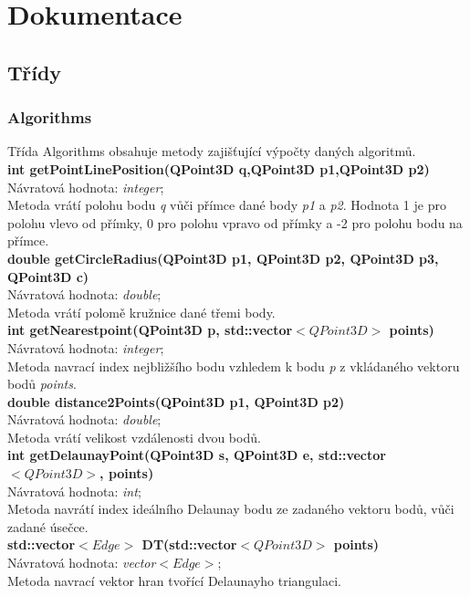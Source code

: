 \documentclass[a4paper, 12pt]{article}
\begin{document}
\section{Dokumentace}
\subsection{Třídy}
\subsubsection{Algorithms}
Třída Algorithms obsahuje metody zajišťující výpočty daných algoritmů.
\\

\textbf{int getPointLinePosition(QPoint3D q,QPoint3D p1,QPoint3D p2)}\\
Návratová hodnota: \textit{integer};\\
Metoda vrátí polohu bodu \textit{q} vůči přímce dané body\textit{ p1} a \textit{p2}. Hodnota 1 je pro polohu vlevo od přímky, 0 pro polohu vpravo od přímky a -2 pro polohu bodu na přímce.
\\

\textbf{double getCircleRadius(QPoint3D p1, QPoint3D p2, QPoint3D p3, QPoint3D c)}\\
Návratová hodnota: \textit{double};\\
Metoda vrátí polomě kružnice dané třemi body.
\\

\textbf{int getNearestpoint(QPoint3D p, std::vector$<QPoint3D>$ points)}\\
Návratová hodnota: \textit{integer};\\
Metoda navrací index nejbližšího bodu vzhledem k bodu \textit{p} z vkládaného vektoru bodů \textit{points}. 
\\

\textbf{double distance2Points(QPoint3D p1, QPoint3D p2)}\\
Návratová hodnota: \textit{double};\\
Metoda vrátí velikost vzdálenosti dvou bodů.
\\

\textbf{int getDelaunayPoint(QPoint3D s, QPoint3D e, std::vector$<QPoint3D>$, points)}\\
Návratová hodnota: \textit{int};\\
Metoda navrátí index ideálního Delaunay bodu ze zadaného vektoru bodů, vůči zadané úsečce.  
\\


\textbf{std::vector$<Edge>$ DT(std::vector$<QPoint3D>$ points)}\\
Návratová hodnota: \textit{vector$<Edge>$};\\
Metoda navrací vektor hran tvořící Delaunayho triangulaci. 
\\
\end{document}
